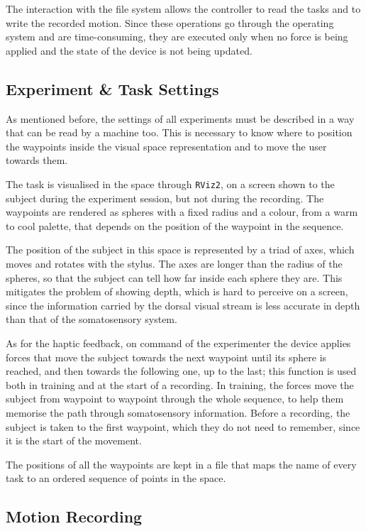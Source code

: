 \documentclass[12pt]{report}
\begin{document}
The interaction with the file system allows the controller to read the tasks and to write the recorded motion. Since these operations go through the operating system and are time-consuming, they are executed only when no force is being applied and the state of the device is not being updated.

\subsection{Experiment \& Task Settings}
As mentioned before, the settings of all experiments must be described in a way that can be read by a machine too. This is necessary to know where to position the waypoints inside the visual space representation and to move the user towards them. 

The task is visualised in the space through \texttt{RViz2}, on a screen shown to the subject during the experiment session, but not during the recording. The waypoints are rendered as spheres with a fixed radius and a colour, from a warm to cool palette, that depends on the position of the waypoint in the sequence.

The position of the subject in this space is represented by a triad of axes, which moves and rotates with the stylus. The axes are longer than the radius of the spheres, so that the subject can tell how far inside each sphere they are. This mitigates the problem of showing depth, which is hard to perceive on a screen, since the information carried by the dorsal visual stream is less accurate in depth than that of the somatosensory system.

As for the haptic feedback, on command of the experimenter the device applies forces that move the subject towards the next waypoint until its sphere is reached, and then towards the following one, up to the last; this function is used both in training and at the start of a recording. In training, the forces move the subject from waypoint to waypoint through the whole sequence, to help them memorise the path through somatosensory information. Before a recording, the subject is taken to the first waypoint, which they do not need to remember, since it is the start of the movement.

The positions of all the waypoints are kept in a file that maps the name of every task to an ordered sequence of points in the space.

\subsection{Motion Recording}
\end{document}
